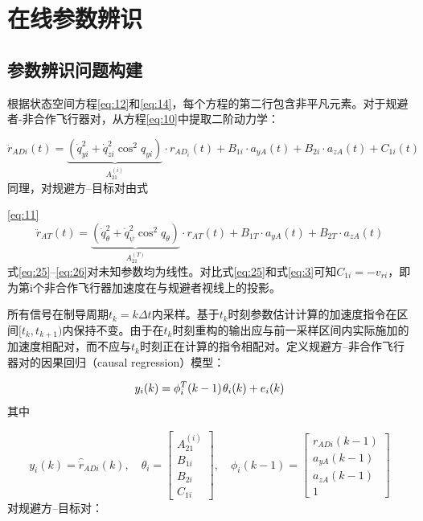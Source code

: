 \section{在线参数辨识}
\subsection{参数辨识问题构建}
根据状态空间方程\eqref{eq:12}和\eqref{eq:14}，每个方程的第二行包含非平凡元素。对于规避者-非合作飞行器对，从方程\eqref{eq:10}中提取二阶动力学：

\begin{equation}
\label{eq:25}
{\ddot r_{ADi}}(t) = \underbrace {(\dot q_{yi}^2 + \dot q_{zi}^2{{\cos }^2}{q_{yi}})}_{A_{21}^{(i)}} \cdot {r_{A{D_i}}}(t) + {B_{1i}} \cdot {a_{yA}}(t) + {B_{2i}} \cdot {a_{zA}}(t) + {C_{1i}}(t)
\end{equation}
同理，对规避方–目标对由式

\eqref{eq:11}\begin{equation}
\label{eq:26}
{\ddot r_{AT}}(t) = \underbrace {(\dot q_\theta ^2 + \dot q_\psi ^2{{\cos }^2}{q_\theta })}_{A_{21}^{(T)}} \cdot {r_{AT}}(t) + {B_{1T}} \cdot {a_{yA}}(t) + {B_{2T}} \cdot {a_{zA}}(t)
\end{equation}
式\eqref{eq:25}–\eqref{eq:26}对未知参数均为线性。对比式\eqref{eq:25}和式\eqref{eq:3}可知${C_{1i}} =  - {v_{ri}}$，即为第i个非合作飞行器加速度在与规避者视线上的投影。

所有信号在制导周期${t_k} = k\Delta t$内采样。基于${t_k}$时刻参数估计计算的加速度指令在区间$[{t_k},{t_{k + 1}})$内保持不变。由于在${t_k}$时刻重构的输出应与前一采样区间内实际施加的加速度相配对，而不应与${t_k}$时刻正在计算的指令相配对。定义规避方–非合作飞行器对的因果回归（causal regression）模型：

\begin{equation}
\label{eq:27}
{y_i}(k) = \phi _i^T(k - 1){\kern 1pt} {\theta _i}(k) + {e_i}(k)
\end{equation}
其中

\begin{equation}
\label{eq:28}
{y_i}(k) = {\hat \ddot r_{ADi}}(k),\quad {\theta _i} = \left[ {\begin{array}{*{20}{c}}
  {A_{21}^{(i)}} \\ 
  {{B_{1i}}} \\ 
  {{B_{2i}}} \\ 
  {{C_{1i}}} 
\end{array}} \right],\quad {\phi _i}(k - 1) = \left[ {\begin{array}{*{20}{c}}
  {{r_{ADi}}(k - 1)} \\ 
  {{a_{yA}}(k - 1)} \\ 
  {{a_{zA}}(k - 1)} \\ 
  1 
\end{array}} \right]
\end{equation}
对规避方–目标对：

